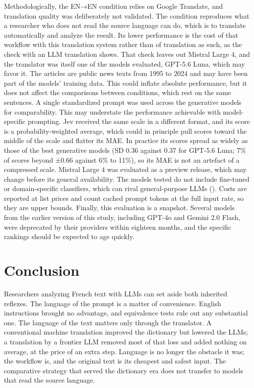 \documentclass[
  man,
  floatsintext,
  longtable,
  nolmodern,
  notxfonts,
  notimes,
  colorlinks=true,linkcolor=blue,citecolor=blue,urlcolor=blue]{apa7}
\begin{document}
Methodologically, the EN→EN condition relies on Google Translate, and
translation quality was deliberately not validated. The condition
reproduces what a researcher who does not read the source language can
do, which is to translate automatically and analyze the result. Its
lower performance is the cost of that workflow with this translation
system rather than of translation as such, as the check with an LLM
translation shows. That check leaves out Mistral Large 4, and the
translator was itself one of the models evaluated, GPT-5.6 Luna, which
may favor it. The articles are public news texts from 1995 to 2024 and
may have been part of the models' training data. This could inflate
absolute performance, but it does not affect the comparisons between
conditions, which rest on the same sentences. A single standardized
prompt was used across the generative models for comparability. This may
understate the performance achievable with model-specific prompting. Jev
received the same scale in a different format, and its score is a
probability-weighted average, which could in principle pull scores
toward the middle of the scale and flatter its MAE. In practice its
scores spread as widely as those of the best generative models (SD 0.36
against 0.37 for GPT-5.6 Luna; 7\% of scores beyond ±0.66 against 6\% to
11\%), so its MAE is not an artefact of a compressed scale. Mistral
Large 4 was evaluated as a preview release, which may change before its
general availability. The models tested do not include fine-tuned or
domain-specific classifiers, which can rival general-purpose LLMs
(). Costs are reported at list prices and count cached prompt tokens
at the full input rate, so they are upper bounds. Finally, this
evaluation is a snapshot. Several models from the earlier version of
this study, including GPT-4o and Gemini 2.0 Flash, were deprecated by
their providers within eighteen months, and the specific rankings should
be expected to age quickly.

\section{Conclusion}\label{conclusion}

Researchers analyzing French text with LLMs can set aside both inherited
reflexes. The language of the prompt is a matter of convenience. English
instructions brought no advantage, and equivalence tests rule out any
substantial one. The language of the text matters only through the
translator. A conventional machine translation improved the dictionary
but lowered the LLMs; a translation by a frontier LLM removed most of
that loss and added nothing on average, at the price of an extra step.
Language is no longer the obstacle it was; the workflow is, and the
original text is its cheapest and safest input. The comparative strategy
that served the dictionary era does not transfer to models that read the
source language.
\end{document}
